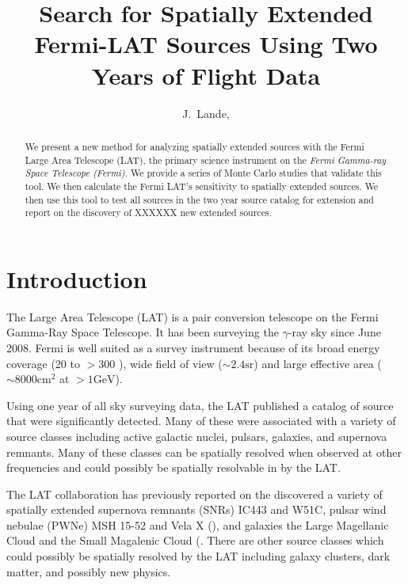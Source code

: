 \documentclass[12pt,preprint]{aastex}
\newcommand{\mev}{\text{MeV}\xspace}
\newcommand{\gev}{\text{GeV}\xspace}
\newcommand{\sr}{\text{sr}\xspace}
\newcommand{\cm}{\text{cm}\xspace}
\begin{document}
\title{Search for Spatially Extended Fermi-LAT Sources Using Two Years of Flight
Data}

\author{
J.~Lande, 
}


\begin{abstract}
We present a new method for analyzing spatially extended sources with
the Fermi Large Area Telescope (LAT), the primary science instrument
on the {\em Fermi Gamma-ray Space Telescope (Fermi)}.  We provide a
series of Monte Carlo studies that validate this tool.
We then calculate the Fermi LAT's sensitivity to spatially extended
sources.  We then use this tool to test all sources in the two
year source catalog for extension and report on the discovery
of XXXXXX new extended sources.
\end{abstract}

\section{Introduction}

The Large Area Telescope (LAT) is a pair conversion telescope on the
Fermi Gamma-Ray Space Telescope. It has been surveying the $\gamma$-ray
sky since June 2008.  Fermi is well suited as a survey
instrument because of its broad energy coverage (20 \mev
to $>300$ \gev), wide field of view ($\sim 2.4 \sr$) and large effective
area ($\sim 8000 \cm^2$ at $>1 \gev$).

Using one year of all sky surveying data, the LAT published a catalog of
source that were significantly detected.  Many of these were associated
with a variety of source classes including active galactic nuclei,
pulsars, galaxies, and supernova remnants.  Many of these classes can be
spatially resolved when observed at other frequencies and could possibly
be spatially resolvable in \gev by the LAT.

The LAT collaboration has previously reported on the discovered
a variety of spatially extended supernova remnants (SNRs)
IC443 and W51C, pulsar wind nebulae (PWNe) MSH 15-52 and Vela X
(\cite{ic443,w51c,msh1552,velax}), and galaxies the Large Magellanic
Cloud and the Small Magalenic Cloud (\cite{lmc,smc}.  There are other
source classes which could possibly be spatially resolved by the LAT
including galaxy clusters, dark matter, and possibly new physics.
\end{document}
